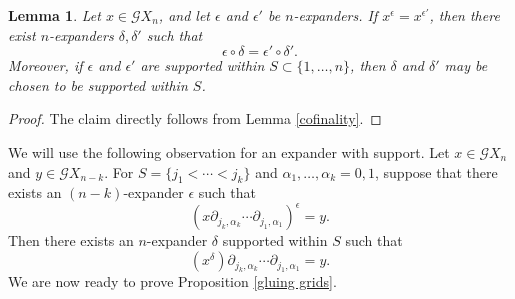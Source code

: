 \documentclass[oneside, 12pt]{amsart}
\numberwithin{equation}{section}
\theoremstyle{plain}
\newtheorem{lemma}[theorem]{Lemma}
\theoremstyle{definition}
\theoremstyle{remark}
\begin{document}
	
	
	\begin{lemma}
		\label{stabilization}
		Let $x\in\mathcal{G}X_n$, and let $\epsilon$ and $\epsilon'$ be $n$-expanders. If $x^{\epsilon}=x^{\epsilon'}$, then there exist $n$-expanders $\delta,\delta'$ such that
		\[
		\epsilon\circ\delta=\epsilon'\circ\delta'.
		\]
		Moreover, if $\epsilon$ and $\epsilon'$ are supported within $S\subset\{1,\ldots,n\}$, then $\delta$ and $\delta'$ may be chosen to be supported within $S$.
	\end{lemma}
	
	\begin{proof}
		The claim directly follows from Lemma \ref{cofinality}.
	\end{proof}
	
	
	
	We will use the following observation for an expander with support. Let $x\in\mathcal{G}X_n$ and $y\in\mathcal{G}X_{n-k}$. For $S=\{j_1<\cdots<j_k\}$ and $\alpha_1,\ldots,\alpha_k=0,1$, suppose that there exists an $(n-k)$-expander $\epsilon$ such that
	\[
	(x\partial_{j_k,\alpha_k}\cdots\partial_{j_1,\alpha_1})^\epsilon=y.
	\]
	Then there exists an $n$-expander $\delta$ supported within $S$ such that
	\[
	(x^\delta)\partial_{j_k,\alpha_k}\cdots\partial_{j_1,\alpha_1}=y.
	\]
	We are now ready to prove Proposition \ref{gluing grids}. %
	
	
	
\end{document}
